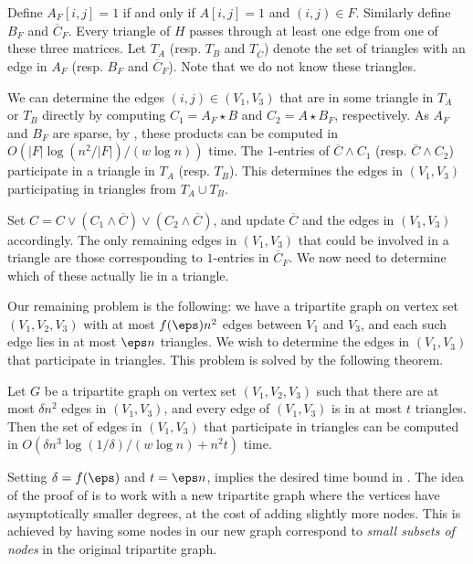 Define $A_F[i,j]=1$ if and only if $A[i,j]=1$ and $(i,j) \in F$. Similarly define $B_F$ and $\overline{C}_F$. Every triangle of $H$ passes through at least one edge from one of these three matrices. Let $T_A$ (resp. $T_B$ and $T_{\overline{C}}$) denote the set of triangles with an edge in ${A}_F$ (resp. $B_F$ and ${\overline{C}}_F$).  Note that we do not know these triangles.

We can determine the edges $(i,j) \in (V_1,V_3)$ that are in some triangle in $T_A$ or $T_B$ directly by computing $C_1 = {A}_F \star B$ and $C_2 = A \star {B}_F$, respectively. As $A_F$ and $B_F$ are sparse, by , these products can be computed in $O(|F|\log(n^2/|F|)/(w\log n))$ time. The $1$-entries of $\overline{C} \wedge C_1$ (resp. $\overline{C} \wedge C_2$) participate in a triangle in $T_A$ (resp. $T_B$). This determines the edges in $(V_1,V_3)$ participating in triangles from $T_A \cup T_B$.

Set $C = C \vee (C_1 \wedge \overline{C}) \vee (C_2 \wedge \overline{C})$, and update $\overline{C}$ and the edges in $(V_1,V_3)$ accordingly. The only remaining edges in $(V_1,V_3)$ that could be involved in a triangle are those corresponding to $1$-entries in ${\overline{C}}_F$. We now need to determine which of these actually lie in a triangle. 

Our remaining problem is the following: we have a tripartite graph on vertex set $(V_1,V_2,V_3)$ with at most $f(\eps) n^2$ edges between $V_1$ and $V_3$, and each such edge lies in at most  $\eps n$ triangles. We wish to determine the edges in $(V_1,V_3)$ that participate in triangles. This problem is solved by the following theorem.

\begin{theorem}\label{sparseedgelisting} Let $G$ be a tripartite graph on vertex set $(V_1,V_2,V_3)$ such that there are at most $\delta n^2$ edges in $(V_1,V_3)$, and every edge of $(V_1,V_3)$ is in at most $t$ triangles. Then the set of edges in $(V_1,V_3)$ that participate in triangles can be computed in $O(\delta n^3 \log(1/\delta)/(w \log n) + n^2 t)$ time. \end{theorem}

Setting $\delta = f(\eps)$ and $t = \eps n$,  implies the desired time bound in . The idea of the proof of  is to work with a new tripartite graph where the vertices have asymptotically smaller degrees, at the cost of adding slightly more nodes. This is achieved by having some nodes in our new graph correspond to \emph{small subsets of nodes} in the original tripartite graph.

